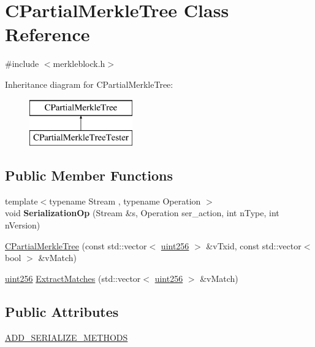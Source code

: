 \hypertarget{class_c_partial_merkle_tree}{}\section{C\+Partial\+Merkle\+Tree Class Reference}
\label{class_c_partial_merkle_tree}


{\ttfamily \#include $<$merkleblock.\+h$>$}

Inheritance diagram for C\+Partial\+Merkle\+Tree\+:\begin{figure}[H]
\begin{center}
\leavevmode
\includegraphics[height=2.000000cm]{class_c_partial_merkle_tree}
\end{center}
\end{figure}
\subsection*{Public Member Functions}
\begin{DoxyCompactItemize}
\item 
\mbox{\label{class_c_partial_merkle_tree_a44903b156e6c77f3ef977324b24daf1f}} 
{\footnotesize template$<$typename Stream , typename Operation $>$ }\\void {\bfseries Serialization\+Op} (Stream \&s, Operation ser\+\_\+action, int n\+Type, int n\+Version)
\item 
\mbox{\hyperlink{class_c_partial_merkle_tree_a0656767dc0d8f3d603c54e5be21d3890}{C\+Partial\+Merkle\+Tree}} (const std\+::vector$<$ \mbox{\hyperlink{classuint256}{uint256}} $>$ \&v\+Txid, const std\+::vector$<$ bool $>$ \&v\+Match)
\item 
\mbox{\hyperlink{classuint256}{uint256}} \mbox{\hyperlink{class_c_partial_merkle_tree_a28c3456d1159b33b6c2689ac88eb56ad}{Extract\+Matches}} (std\+::vector$<$ \mbox{\hyperlink{classuint256}{uint256}} $>$ \&v\+Match)
\end{DoxyCompactItemize}
\subsection*{Public Attributes}
\begin{DoxyCompactItemize}
\item 
\mbox{\hyperlink{class_c_partial_merkle_tree_ae218db8103edb6672fe0d642535c7490}{A\+D\+D\+\_\+\+S\+E\+R\+I\+A\+L\+I\+Z\+E\+\_\+\+M\+E\+T\+H\+O\+DS}}
\end{DoxyCompactItemize}
